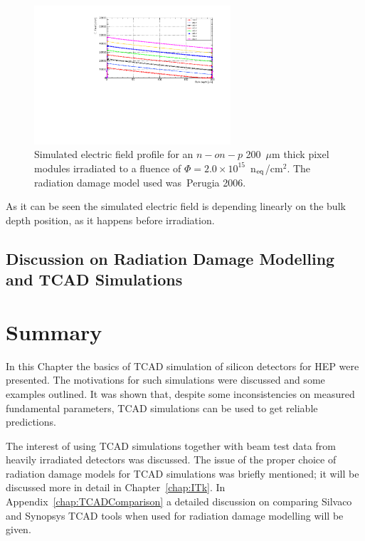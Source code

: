 \begin{figure}[!htpb]
\centering
\includegraphics[width=0.65\textwidth]{EField_Natascha_fl2e15_Petasecca.pdf}
\caption{\label{fig:EField_Profile_Perugia2006}Simulated electric field profile for an $n-on-p$ 200~$\mu$m thick pixel modules irradiated to a fluence of 
$\Phi = 2.0\times10^{15}$~n$_{\rm eq}$/cm$^2$. The radiation damage model used was~Perugia 2006\cite{Moscatelli-2006}.}
\end{figure}
As it can be seen the simulated electric field is depending linearly on the bulk depth position, 
as it happens before irradiation. 

\subsection{Discussion on Radiation Damage Modelling and TCAD Simulations}
\label{sec:TCADComparison}


\section{Summary}
\label{sec:TCADSummary}

In this Chapter the basics of TCAD simulation of silicon detectors for HEP were presented. 
The motivations for such simulations were discussed and some examples outlined. 
It was shown that, despite some inconsistencies on measured fundamental parameters, TCAD 
simulations can be used to get reliable predictions. 

The interest of using TCAD simulations together with beam test data from heavily irradiated detectors 
was discussed. The issue of the proper choice of radiation damage models for TCAD simulations 
was briefly mentioned; it will be discussed more in detail in Chapter~\ref{chap:ITk}. 
In Appendix~\ref{chap:TCADComparison} a detailed discussion on comparing Silvaco and Synopsys 
TCAD tools when used for radiation damage modelling will be given.


